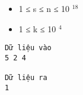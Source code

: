 \begin{itemize}
	\item     1 ≤ s ≤ n ≤ 10    $^     18    $
	\item     1 ≤ k ≤ 10    $^     4    $
\end{itemize}
\begin{verbatim}
Dữ liệu vào
5 2 4

Dữ liệu ra
1
\end{verbatim}